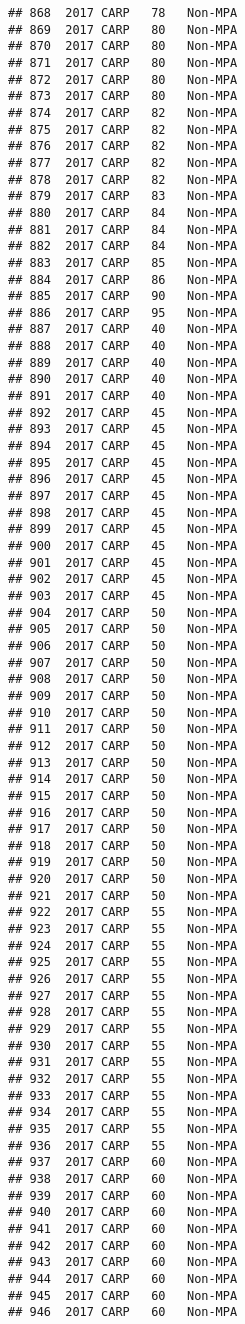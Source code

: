 \documentclass[]{article}
\begin{document}
\begin{verbatim}
## 868  2017 CARP   78   Non-MPA
## 869  2017 CARP   80   Non-MPA
## 870  2017 CARP   80   Non-MPA
## 871  2017 CARP   80   Non-MPA
## 872  2017 CARP   80   Non-MPA
## 873  2017 CARP   80   Non-MPA
## 874  2017 CARP   82   Non-MPA
## 875  2017 CARP   82   Non-MPA
## 876  2017 CARP   82   Non-MPA
## 877  2017 CARP   82   Non-MPA
## 878  2017 CARP   82   Non-MPA
## 879  2017 CARP   83   Non-MPA
## 880  2017 CARP   84   Non-MPA
## 881  2017 CARP   84   Non-MPA
## 882  2017 CARP   84   Non-MPA
## 883  2017 CARP   85   Non-MPA
## 884  2017 CARP   86   Non-MPA
## 885  2017 CARP   90   Non-MPA
## 886  2017 CARP   95   Non-MPA
## 887  2017 CARP   40   Non-MPA
## 888  2017 CARP   40   Non-MPA
## 889  2017 CARP   40   Non-MPA
## 890  2017 CARP   40   Non-MPA
## 891  2017 CARP   40   Non-MPA
## 892  2017 CARP   45   Non-MPA
## 893  2017 CARP   45   Non-MPA
## 894  2017 CARP   45   Non-MPA
## 895  2017 CARP   45   Non-MPA
## 896  2017 CARP   45   Non-MPA
## 897  2017 CARP   45   Non-MPA
## 898  2017 CARP   45   Non-MPA
## 899  2017 CARP   45   Non-MPA
## 900  2017 CARP   45   Non-MPA
## 901  2017 CARP   45   Non-MPA
## 902  2017 CARP   45   Non-MPA
## 903  2017 CARP   45   Non-MPA
## 904  2017 CARP   50   Non-MPA
## 905  2017 CARP   50   Non-MPA
## 906  2017 CARP   50   Non-MPA
## 907  2017 CARP   50   Non-MPA
## 908  2017 CARP   50   Non-MPA
## 909  2017 CARP   50   Non-MPA
## 910  2017 CARP   50   Non-MPA
## 911  2017 CARP   50   Non-MPA
## 912  2017 CARP   50   Non-MPA
## 913  2017 CARP   50   Non-MPA
## 914  2017 CARP   50   Non-MPA
## 915  2017 CARP   50   Non-MPA
## 916  2017 CARP   50   Non-MPA
## 917  2017 CARP   50   Non-MPA
## 918  2017 CARP   50   Non-MPA
## 919  2017 CARP   50   Non-MPA
## 920  2017 CARP   50   Non-MPA
## 921  2017 CARP   50   Non-MPA
## 922  2017 CARP   55   Non-MPA
## 923  2017 CARP   55   Non-MPA
## 924  2017 CARP   55   Non-MPA
## 925  2017 CARP   55   Non-MPA
## 926  2017 CARP   55   Non-MPA
## 927  2017 CARP   55   Non-MPA
## 928  2017 CARP   55   Non-MPA
## 929  2017 CARP   55   Non-MPA
## 930  2017 CARP   55   Non-MPA
## 931  2017 CARP   55   Non-MPA
## 932  2017 CARP   55   Non-MPA
## 933  2017 CARP   55   Non-MPA
## 934  2017 CARP   55   Non-MPA
## 935  2017 CARP   55   Non-MPA
## 936  2017 CARP   55   Non-MPA
## 937  2017 CARP   60   Non-MPA
## 938  2017 CARP   60   Non-MPA
## 939  2017 CARP   60   Non-MPA
## 940  2017 CARP   60   Non-MPA
## 941  2017 CARP   60   Non-MPA
## 942  2017 CARP   60   Non-MPA
## 943  2017 CARP   60   Non-MPA
## 944  2017 CARP   60   Non-MPA
## 945  2017 CARP   60   Non-MPA
## 946  2017 CARP   60   Non-MPA

\end{verbatim}
\end{document}
